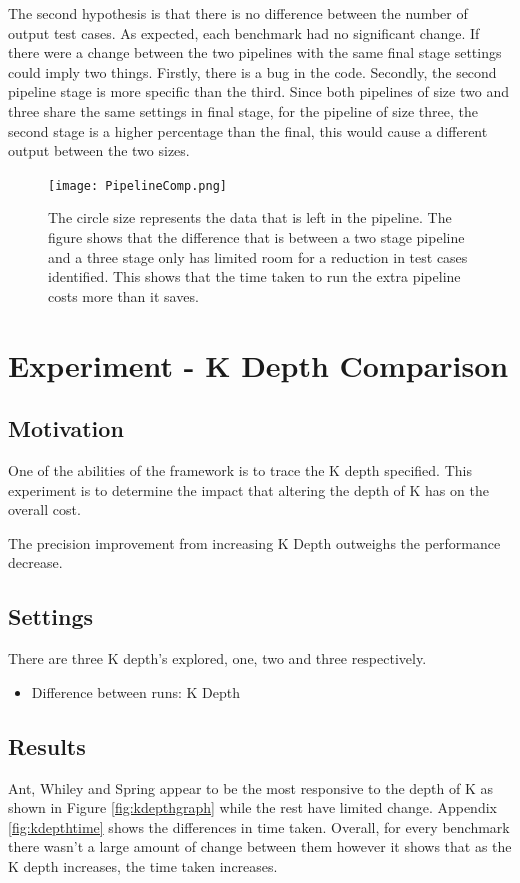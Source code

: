 The second hypothesis is that there is no difference between the number of output test cases. As expected, each benchmark had no significant change. If there were a change between the two pipelines with the same final stage settings could imply two things. Firstly, there is a bug in the code. Secondly, the second pipeline stage is more specific than the third. Since both pipelines of size two and three share the same settings in final stage, for the pipeline of size three, the second stage is a higher percentage than the final, this would cause a different output between the two sizes. 

\begin{figure}[h]
\centering
\texttt{[image: PipelineComp.png]}
\caption{The circle size represents the data that is left in the pipeline. The figure shows that the difference that is between a two stage pipeline and a three stage only has limited room for a reduction in test cases identified. This shows that the time taken to run the extra pipeline costs more than it saves.}
\label{fig:pipelinecomp}
\end{figure}

\section{Experiment  - K Depth Comparison}
\label{kdepthcomp}
\subsection{Motivation}
One of the abilities of the framework is to trace the K depth specified. This experiment is to determine the impact that altering the depth of K has on the overall cost. 

\begin{hyp}
The precision improvement from increasing K Depth outweighs the performance decrease.
\end{hyp}

\subsection{Settings}
There are three K depth's explored, one, two and three respectively.

\begin{itemize}
\item Difference between runs: K Depth
\end{itemize}

\subsection{Results}
Ant, Whiley and Spring appear to be the most responsive to the depth of K as shown in Figure \ref{fig:kdepthgraph} while the rest have limited change. Appendix \ref{fig:kdepthtime} shows the differences in time taken. Overall, for every benchmark there wasn't a large amount of change between them however it shows that as the K depth increases, the time taken increases.

